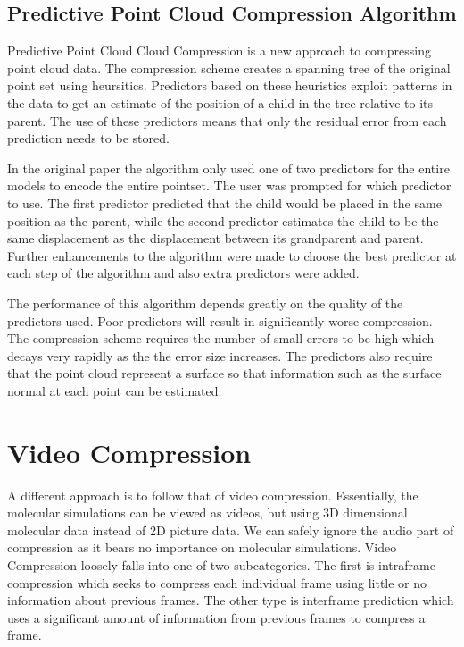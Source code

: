 \documentclass[a4paper,11pt]{report}
\begin{document}
\subsection{Predictive Point Cloud Compression Algorithm}

Predictive Point Cloud Cloud Compression is a new approach to compressing point cloud data. The compression scheme creates a spanning tree of the original point set using heursitics.\cite{gumholdcomp} Predictors based on these heuristics exploit patterns in the data to get an estimate of the position of a child in the tree relative to its parent. The use of these predictors means that only the residual error from each prediction needs to be stored.

In the original paper the algorithm only used one of two predictors for the entire models to encode the entire pointset. The user was prompted for which predictor to use. The first predictor predicted that the child would be placed in the same position as the parent, while the second predictor estimates the child to be the same displacement as the displacement between its grandparent and parent. Further enhancements to the algorithm were made to choose the best predictor at each step of the algorithm and also extra predictors were added.\cite{merrycomp}

The performance of this algorithm depends greatly on the quality of the predictors used. Poor predictors will result in significantly worse compression. The compression scheme requires the number of small errors to be high which decays very rapidly as the the error size increases. The predictors also require that the point cloud represent a surface so that information such as the surface normal at each point can be estimated.

\section{Video Compression}

A different approach is to follow that of video compression. Essentially, the molecular simulations can be viewed as videos, but using 3D dimensional molecular data instead of 2D picture data. We can safely ignore the audio part of compression as it bears no importance on molecular simulations. Video Compression loosely falls into one of two subcategories. The first is intraframe compression which seeks to compress each individual frame using little or no information about previous frames. The other type is interframe prediction which uses a significant amount of information from previous frames to compress a frame. 
\end{document}
